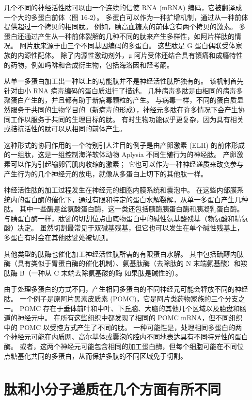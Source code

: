 几个不同的神经活性肽可以由一个连续的信使 RNA (mRNA) 编码，它被翻译成一个大的多蛋白前体（图 16-2）。 
多蛋白可以作为一种扩增机制，通过从一种前体提供超过一个拷贝的相同肽。 
例如，胰高血糖素的前体含有两个拷贝的激素。 
多蛋白还通过产生从一种前体裂解的几种不同的肽来产生多样性，如阿片样肽的情况。 
阿片肽来源于由三个不同基因编码的多蛋白。 
这些肽是 G 蛋白偶联受体家族的内源性配体。 
除了内源性激动剂外，μ 阿片受体还结合具有镇痛和成瘾特性的药物，例如吗啡和合成衍生物，包括海洛因和羟考酮。


从单一多蛋白加工出一种以上的功能肽并不是神经活性肽所独有的。 
该机制首先针对由小 RNA 病毒编码的蛋白质进行了描述。 
几种病毒多肽是由相同的病毒多聚蛋白产生的，并且都有助于新病毒颗粒的产生。 
与病毒一样，不同的蛋白质显然服务于共同的生物学目的（新病毒的形成），神经元多肽在许多情况下会产生协同工作以服务于共同的生理目标的肽。 
有时生物功能似乎更复杂，因为具有相关或拮抗活性的肽可以从相同的前体产生。


这种形式的协同作用的一个特别引人注目的例子是由产卵激素 (ELH) 的前体形成的一组肽，这是一组控制海洋软体动物 Aplysia 不同生殖行为的神经肽。 
产卵激素可以作为引起输卵管肌肉收缩的激素； 它也可以作为一种神经递质来改变参与产生行为的几个神经元的放电，就像从多蛋白上切下的其他肽一样。


神经活性肽的加工过程发生在神经元的细胞内膜系统和囊泡中。 
在这些内部膜系统内的蛋白酶的催化下，通过有限和特定的蛋白水解裂解，从单一多蛋白产生几种肽。 
其中一些酶是丝氨酸蛋白酶，这一类还包括胰酶胰蛋白酶和胰凝乳蛋白酶。 
与胰蛋白酶一样，肽键的切割位点由底物蛋白中的碱性氨基酸残基（赖氨酸和精氨酸）决定。 
虽然切割最常见于双碱基残基，但它也可以发生在单个碱性残基上，多蛋白有时会在其他肽键处被切割。


其他类型的肽酶也催化加工神经活性肽所需的有限蛋白水解。 
其中包括硫醇内肽酶（具有类似于胃蛋白酶的催化机制）、氨基肽酶（去除肽的 N 末端氨基酸）和羧肽酶 B（一种从 C 末端去除氨基酸的酶 如果肽是碱性的）。


由于处理多蛋白的方式不同，产生相同多蛋白的不同神经元可能会释放不同的神经肽。 
一个例子是原阿片黑素皮质素 (POMC)，它是阿片类药物家族的三个分支之一。 
POMC 存在于垂体前叶和中叶、下丘脑、大脑的其他几个区域以及胎盘和肠道的神经元中。 
在所有这些组织中都发现了相同的 POMC mRNA，但不同组织中的 POMC 以受控方式产生了不同的肽。 
一种可能性是，处理相同多蛋白的两个神经元可能在内质网、高尔基体或囊泡的腔内不同地表达具有不同特异性的蛋白酶。 
或者，这两个神经元可能包含相同的加工蛋白酶，但每个细胞可能在不同位点糖基化共同的多蛋白，从而保护多肽的不同区域免于切割。



\section{肽和小分子递质在几个方面有所不同}

